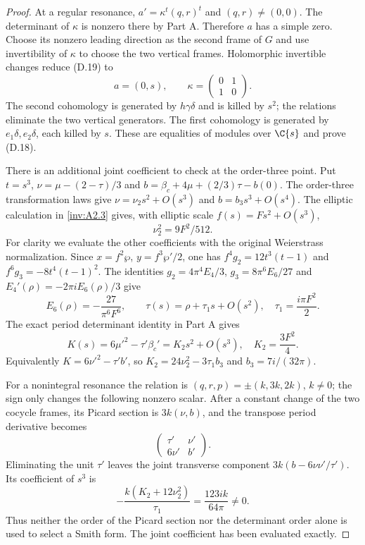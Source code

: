 \begin{proof}
At a regular resonance, $a'=\kappa^t(q,r)^t$ and
$(q,r)\ne(0,0)$. The determinant of $\kappa$ is nonzero there by
Part A. Therefore $a$ has a simple zero. Choose its nonzero leading
direction as the second frame of $G$ and use invertibility of
$\kappa$ to choose the two vertical frames. Holomorphic invertible
changes reduce (D.19) to
\[
 a=(0,s),\qquad \kappa=\begin{pmatrix}0&1\\1&0\end{pmatrix}. \tag{D.21}
\]
The second cohomology is generated by $h\gamma\delta$ and is killed
by $s^2$; the relations eliminate the two vertical generators.
The first cohomology is generated by $e_1\delta,e_2\delta$, each
killed by $s$. These are equalities of modules over $\C\{s\}$
and prove (D.18).

There is an additional joint coefficient to check at the order-three
point. Put $t=s^3$, $\nu=\mu-(2-\tau)/3$ and
$b=\beta_c+4\mu+(2/3)\tau-b(0)$. The order-three transformation
laws give $\nu=\nu_2s^2+O(s^3)$ and $b=b_3s^3+O(s^4)$.
The elliptic calculation in \ref{inv:A2.3} gives, with elliptic scale
$f(s)=F s^2+O(s^3)$,
\[
 \nu_2^2=9F^2/512.
\]
For clarity we evaluate the other coefficients with the original
Weierstrass normalization. Since $x=f^2\wp$,
$y=f^3\wp'/2$, one has
$f^4g_2=12t^3(t-1)$ and $f^6g_3=-8t^4(t-1)^2$.
The identities $g_2=4\pi^4E_4/3$, $g_3=8\pi^6E_6/27$ and
$E_4'(\rho)=-2\pi iE_6(\rho)/3$ give
\[
 E_6(\rho)=-\frac{27}{\pi^6F^6},\qquad
 \tau(s)=\rho+\tau_1s+O(s^2),\quad \tau_1=\frac{i\pi F^2}{2}.
\]
The exact period determinant identity in Part A gives
\[
 K(s)=6\mu'^2-\tau'\beta_c'=K_2s^2+O(s^3),
 \quad K_2=\frac{3F^2}{4}.
\]
Equivalently $K=6\nu'^2-\tau'b'$, so
$K_2=24\nu_2^2-3\tau_1b_3$ and $b_3=7i/(32\pi)$.

For a nonintegral resonance the relation is
$(q,r,p)=\pm(k,3k,2k)$, $k\ne0$; the sign only changes the
following nonzero scalar. After a constant change of the two
cocycle frames, its Picard section is $3k(\nu,b)$, and the
transpose period derivative becomes
\[
 \begin{pmatrix}\tau'&\nu'\\6\nu'&b'\end{pmatrix}.
\]
Eliminating the unit $\tau'$ leaves the joint transverse component
$3k(b-6\nu\nu'/\tau')$. Its coefficient of $s^3$ is
\[
 -\frac{k(K_2+12\nu_2^2)}{\tau_1}
       =\frac{123ik}{64\pi}\ne0.                      \tag{D.22}
\]
Thus neither the order of the Picard section nor the determinant
order alone is used to select a Smith form. The joint coefficient
has been evaluated exactly.


\end{proof}
